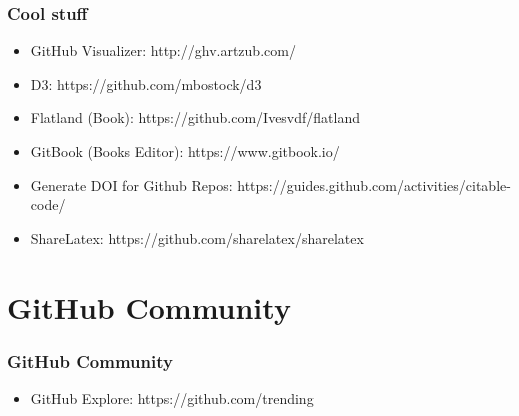 \begin{frame}
    \frametitle{Cool stuff}
    
    \begin{itemize}
    \item GitHub Visualizer: http://ghv.artzub.com/ \pause
    
    \item D3: https://github.com/mbostock/d3 \pause
    
    \item Flatland (Book): https://github.com/Ivesvdf/flatland
    
    \item GitBook (Books Editor): https://www.gitbook.io/
    
    \item Generate DOI for Github Repos: https://guides.github.com/activities/citable-code/
    
    \item ShareLatex: https://github.com/sharelatex/sharelatex
    \end{itemize}
\end{frame}

\section[GitHub Community]{GitHub Community}
\begin{frame}
    \frametitle{GitHub Community}
    
    \begin{itemize}
    \item GitHub Explore: https://github.com/trending \pause
    \end{itemize}
\end{frame}

